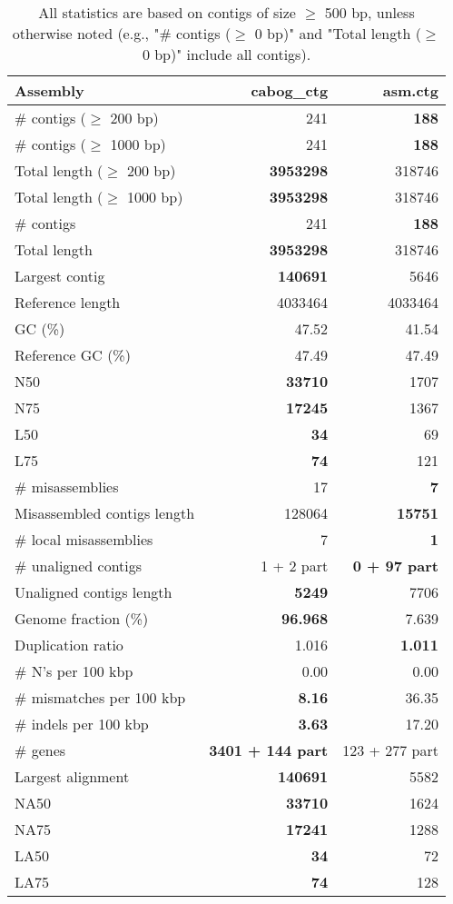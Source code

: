 \documentclass[12pt,a4paper]{article}
\begin{document}
\begin{table}[ht]
\begin{center}
\caption{All statistics are based on contigs of size $\geq$ 500 bp, unless otherwise noted (e.g., "\# contigs ($\geq$ 0 bp)" and "Total length ($\geq$ 0 bp)" include all contigs).}
\begin{tabular}{|l*{2}{|r}|}
\hline
Assembly & cabog\_ctg & asm.ctg \\ \hline
\# contigs ($\geq$ 200 bp) & 241 & {\bf 188} \\ \hline
\# contigs ($\geq$ 1000 bp) & 241 & {\bf 188} \\ \hline
Total length ($\geq$ 200 bp) & {\bf 3953298} & 318746 \\ \hline
Total length ($\geq$ 1000 bp) & {\bf 3953298} & 318746 \\ \hline
\# contigs & 241 & {\bf 188} \\ \hline
Total length & {\bf 3953298} & 318746 \\ \hline
Largest contig & {\bf 140691} & 5646 \\ \hline
Reference length & 4033464 & 4033464 \\ \hline
GC (\%) & 47.52 & 41.54 \\ \hline
Reference GC (\%) & 47.49 & 47.49 \\ \hline
N50 & {\bf 33710} & 1707 \\ \hline
N75 & {\bf 17245} & 1367 \\ \hline
L50 & {\bf 34} & 69 \\ \hline
L75 & {\bf 74} & 121 \\ \hline
\# misassemblies & 17 & {\bf 7} \\ \hline
Misassembled contigs length & 128064 & {\bf 15751} \\ \hline
\# local misassemblies & 7 & {\bf 1} \\ \hline
\# unaligned contigs & 1 + 2 part & {\bf 0 + 97 part} \\ \hline
Unaligned contigs length & {\bf 5249} & 7706 \\ \hline
Genome fraction (\%) & {\bf 96.968} & 7.639 \\ \hline
Duplication ratio & 1.016 & {\bf 1.011} \\ \hline
\# N's per 100 kbp & 0.00 & 0.00 \\ \hline
\# mismatches per 100 kbp & {\bf 8.16} & 36.35 \\ \hline
\# indels per 100 kbp & {\bf 3.63} & 17.20 \\ \hline
\# genes & {\bf 3401 + 144 part} & 123 + 277 part \\ \hline
Largest alignment & {\bf 140691} & 5582 \\ \hline
NA50 & {\bf 33710} & 1624 \\ \hline
NA75 & {\bf 17241} & 1288 \\ \hline
LA50 & {\bf 34} & 72 \\ \hline
LA75 & {\bf 74} & 128 \\ \hline
\end{tabular}
\end{center}
\end{table}
\end{document}

